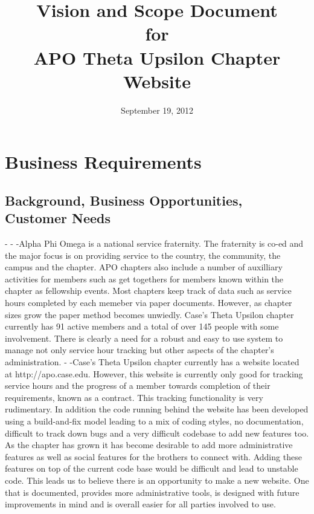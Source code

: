 \documentclass[11pt,letterpaper,rotate]{article}
\title{Vision and Scope Document \\
for \\
APO Theta Upsilon Chapter Website}
\date{September 19, 2012}
\begin{document}
\maketitle
\newpage

\tableofcontents
\listoffigures

\newpage

\section{Business Requirements}


\subsection{Background, Business Opportunities, Customer Needs}

	-
	-
	-Alpha Phi Omega is a national service fraternity. The fraternity is co-ed and the major focus is on providing service to the country, the community, the campus and the chapter. APO chapters also include a number of auxilliary activities for members such as get togethers for members known within the chapter as fellowship events. Most chapters keep track of data such as service hours completed by each memeber via paper documents. However, as chapter sizes grow the paper method becomes unwiedly. Case's Theta Upsilon chapter currently has 91 active members and a total of over 145 people with some involvement. There is clearly a need for a robust and easy to use system to manage not only service hour tracking but other aspects of the chapter's administration.
	-
	-Case's Theta Upsilon chapter currently has a website located at http://apo.case.edu. However, this website is currently only good for tracking service hours and the progress of a member towards completion of their requirements, known as a contract. This tracking functionality is very rudimentary. In addition the code running behind the website has been developed using a build-and-fix model leading to a mix of coding styles, no documentation, difficult to track down bugs and a very difficult codebase to add new features too. As the chapter has grown it has become desirable to add more administrative features as well as social features for the brothers to connect with. Adding these features on top of the current code base would be difficult and lead to unstable code. This leads us to believe there is an opportunity to make a new website. One that is documented, provides more administrative tools, is designed with future improvements in mind and is overall easier for all parties involved to use.
\end{document}
